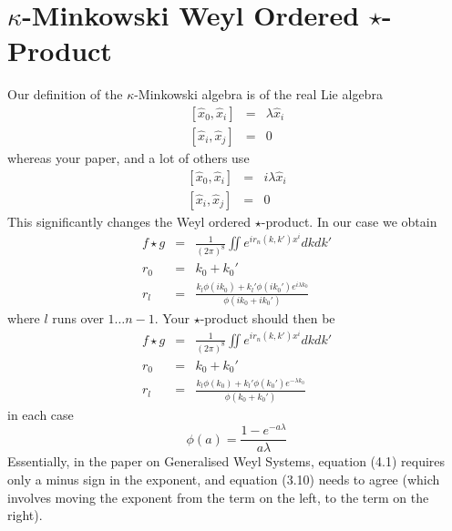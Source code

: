 \documentclass[11pt, a4paper]{article}
\newcommand{\cb}[2]{\left[#1,#2\right]}                 %
\begin{document}
\section{$\kappa$-Minkowski Weyl Ordered $\star$-Product}
Our definition of the $\kappa$-Minkowski algebra is of the real Lie algebra
\begin{eqnarray*}
  \cb{\hat x_0}{\hat x_i}&=&\lambda\hat x_i\\ \nonumber
  \cb{\hat x_i}{\hat x_j}&=&0
\end{eqnarray*}
whereas your paper, and a lot of others use
\begin{eqnarray*}
  \cb{\hat x_0}{\hat x_i}&=&i\lambda\hat x_i\\ \nonumber
  \cb{\hat x_i}{\hat x_j}&=&0
\end{eqnarray*}
This significantly changes the Weyl ordered $\star$-product. In our case we obtain
\begin{eqnarray*}
  f\star g&=&\frac{1}{(2\pi)^{8}}\iint
  e^{ir_n(k,k')x^i}dkdk'\\ \nonumber
  r_0&=&k_0+k_0'\\ \nonumber
  r_l&=&\frac{k_l\phi(ik_0)+k_l'\phi(ik_0')e^{i\lambda k_0}}{\phi(ik_0+ik_0')}
\end{eqnarray*}
where $l$ runs over $1\ldots n-1$. Your $\star$-product should then be
\begin{eqnarray*}
  f\star g&=&\frac{1}{(2\pi)^{8}}\iint
  e^{ir_n(k,k')x^i}dkdk'\\ \nonumber
  r_0&=&k_0+k_0'\\ \nonumber
  r_l&=&\frac{k_l\phi(k_0)+k_l'\phi(k_0')e^{-\lambda k_0}}{\phi(k_0+k_0')}
\end{eqnarray*}
in each case
\begin{equation*}
  \phi(a)=\frac{1-e^{-a\lambda}}{a\lambda}
\end{equation*}
Essentially, in the paper on Generalised Weyl Systems, equation (4.1) requires
only a minus sign in the exponent, and equation (3.10) needs to agree (which
involves moving the exponent from the term on the left, to the term on the
right).
\end{document}
